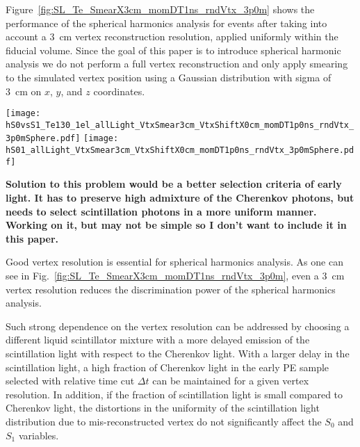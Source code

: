 Figure~\ref{fig:SL_Te_SmearX3cm_momDT1ns_rndVtx_3p0m} shows the performance of the spherical harmonics analysis for events after taking into account a 3~cm vertex reconstruction resolution, applied uniformly within the fiducial volume. Since the goal of this paper is to introduce spherical harmonic analysis we do not perform a full vertex reconstruction and only apply smearing to the simulated vertex position using a Gaussian distribution with sigma of 3~cm on $x$, $y$, and $z$ coordinates. 

\begin{figure*}[h]
  \centering
  \texttt{[image: hS0vsS1\_Te130\_1el\_allLight\_VtxSmear3cm\_VtxShiftX0cm\_momDT1p0ns\_rndVtx\_3p0mSphere.pdf]}
  \texttt{[image: hS01\_allLight\_VtxSmear3cm\_VtxShiftX0cm\_momDT1p0ns\_rndVtx\_3p0mSphere.pdf]}
  \caption{Spherical harmonics comparison between $^{130}$Te 0{\nbb}
    decay signal ($Q=2.529$~MeV) (\emph{red}) and $^{8}$B solar
    neutrinos background (\emph{blue}) for 1000 simulated
    events.Verticies are uniformly distributed within the fiducial
    volume, R$<$3~m. $^8$Be events are implemented as 2.529~MeV
    electrons with the initial momentum direction uniformly
    distributed within 4$\pi$ solid angle. Vetrex is smeared with 3~cm
    resolution. \emph{Left:} $S_0$ versus $S_1$ scatter plot. Black
    dotted line is a linear fit of these 2D histograms. Variable
    $S_{01}$ is defined as a projection of 2D distribution onto this
    linear fit. \emph{Right:} $S_{01}$}
\label{fig:SL_Te_SmearX3cm_momDT1ns_rndVtx_3p0m}
\end{figure*}


{\bf Solution to this problem would be a better selection criteria of
  early light. It has to preserve high admixture of the Cherenkov
  photons, but needs to select scintillation photons in a more uniform
  manner. Working on it, but may not be simple so I don't want to
  include it in this paper.}

Good vertex resolution is essential for spherical harmonics analysis. As one can see in Fig.~\ref{fig:SL_Te_SmearX3cm_momDT1ns_rndVtx_3p0m}, even a 3~cm vertex resolution reduces the discrimination power of the spherical harmonics analysis.

Such strong dependence on the vertex resolution can be
addressed by choosing a different liquid scintillator mixture with a
more delayed emission of the scintillation light with respect to the Cherenkov light. With a larger delay in the scintillation light, a high fraction of Cherenkov light in the early PE sample selected with relative time cut $\Delta t$ can be maintained for a given vertex resolution. In addition, if the fraction of scintillation light is small compared to Cherenkov light, the distortions in the uniformity of the scintillation light distribution due to mis-reconstructed vertex do not significantly affect the $S_0$ and $S_1$ variables.

